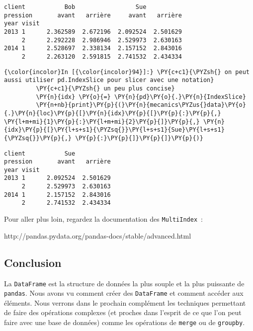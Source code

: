     \begin{Verbatim}[commandchars=\\\{\},frame=single,framerule=0.3mm,rulecolor=\color{cellframecolor}]
client           Bob                 Sue          
pression       avant   arrière     avant   arrière
year visit                                        
2013 1      2.362589  2.672196  2.092524  2.501629
     2      2.292228  2.986946  2.529973  2.630163
2014 1      2.528697  2.338134  2.157152  2.843016
     2      2.263120  2.591815  2.741532  2.434334
\end{Verbatim}

    \begin{Verbatim}[commandchars=\\\{\},frame=single,framerule=0.3mm,rulecolor=\color{cellframecolor}]
{\color{incolor}In [{\color{incolor}94}]:} \PY{c+c1}{\PYZsh{} on peut aussi utiliser pd.IndexSlice pour slicer avec une notation}
         \PY{c+c1}{\PYZsh{} un peu plus concise}
         \PY{n}{idx} \PY{o}{=} \PY{n}{pd}\PY{o}{.}\PY{n}{IndexSlice}
         \PY{n+nb}{print}\PY{p}{(}\PY{n}{mecanics\PYZus{}data}\PY{o}{.}\PY{n}{loc}\PY{p}{[}\PY{n}{idx}\PY{p}{[}\PY{p}{:}\PY{p}{,} \PY{l+m+mi}{1}\PY{p}{:}\PY{l+m+mi}{2}\PY{p}{]}\PY{p}{,} \PY{n}{idx}\PY{p}{[}\PY{l+s+s1}{\PYZsq{}}\PY{l+s+s1}{Sue}\PY{l+s+s1}{\PYZsq{}}\PY{p}{,} \PY{p}{:}\PY{p}{]}\PY{p}{]}\PY{p}{)}
\end{Verbatim}


    \begin{Verbatim}[commandchars=\\\{\},frame=single,framerule=0.3mm,rulecolor=\color{cellframecolor}]
client           Sue          
pression       avant   arrière
year visit                    
2013 1      2.092524  2.501629
     2      2.529973  2.630163
2014 1      2.157152  2.843016
     2      2.741532  2.434334
\end{Verbatim}

    Pour aller plus loin, regardez la documentation des
\texttt{MultiIndex}~:

http://pandas.pydata.org/pandas-docs/stable/advanced.html

    \hypertarget{conclusion}{%
\subsection{Conclusion}\label{conclusion}}

    La \texttt{DataFrame} est la structure de données la plus souple et la
plus puissante de \texttt{pandas}. Nous avons vu comment créer des
\texttt{DataFrame} et comment accéder aux éléments. Nous verrons dans le
prochain complément les techniques permettant de faire des opérations
complexes (et proches dans l'esprit de ce que l'on peut faire avec une
base de données) comme les opérations de \texttt{merge} ou de
\texttt{groupby}.


    
    
    
